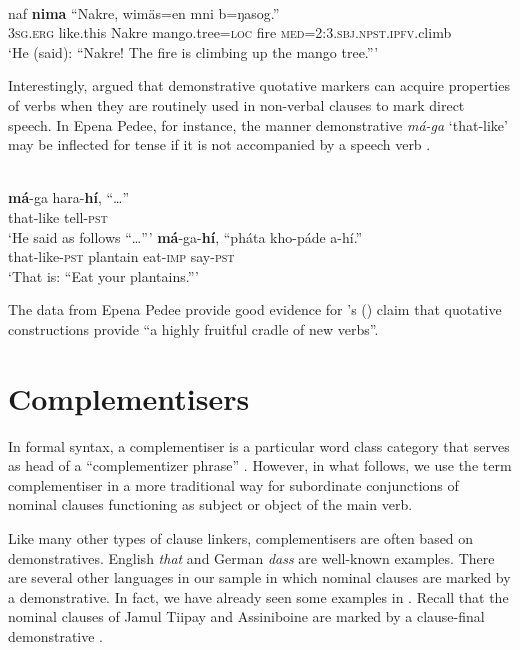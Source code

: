 \documentclass[output=paper,colorlinks,citecolor=brown]{langscibook}
\begin{document}
\ea\label{ex:diessel:18}
\\
\gll naf   \textbf{nima}  “Nakre,   wimäs=en  mni b=ŋasog.”\\
     \textsc{3sg.erg} like.this {\db}Nakre   mango.tree=\textsc{loc}  fire \textsc{med=2:3.sbj.npst.ipfv}.climb\\
\glt ‘He (said): “Nakre! The fire is climbing up the mango tree.”’
\z

Interestingly, \citet[322-326]{Güldemann2008} argued that demonstrative quotative markers can acquire properties of verbs when they are routinely used in non-verbal clauses to mark direct speech. In Epena Pedee, for instance, the manner demonstrative \textit{má-ga} ‘that-like’ may be inflected for tense if it is not accompanied by a speech verb .

\ea\label{ex:diessel:19}
\\
\ea\label{ex:diessel:19a}
\gll   \textbf{má}-ga  hara-\textbf{hí},  “…”\\
       that-like  tell-\textsc{pst}\\
\glt ‘He said as follows “…”’
\ex\label{ex:diessel:19b}
\gll   \textbf{má}-ga-\textbf{hí},  “pháta     kho-páde  a-hí.”\\
       that-like-\textsc{pst}  {\db}plantain  eat-\textsc{imp}    say-\textsc{pst}\\
\glt   ‘That is: “Eat your plantains.”’
\z\z

The data from Epena Pedee provide good evidence for \citeauthor{Güldemann2008}’s (\citeyear[529]{Güldemann2008}) claim that quotative constructions provide “a highly fruitful cradle of new verbs”. 

\section{Complementisers}\label{sec:diessel:5}

In formal syntax, a complementiser is a particular word class category that serves as head of a “complementizer phrase” \citep{Radford1997}. However, in what follows, we use the term complementiser in a more traditional way for subordinate conjunctions of nominal clauses functioning as subject or object of the main verb.

Like many other types of clause linkers, complementisers are often based on demonstratives. English \textit{that} and German \textit{dass} are well-known examples. There are several other languages in our sample in which nominal clauses are marked by a demonstrative. In fact, we have already seen some examples in . Recall that the nominal clauses of Jamul Tiipay and Assiniboine are marked by a clause-final demonstrative .
\end{document}
